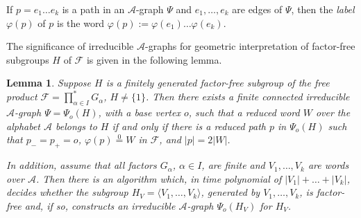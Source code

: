 \documentclass[10pt, reqno]{amsart}
\numberwithin{equation}{section}
\newtheorem{lem}[thm]{Lemma}
\begin{document}
If $p = e_1 \dots e_k$ is a path in an  ${\mathcal{A}}$-graph $\Psi$ and $e_1, \dots, e_k$ are edges of $\Psi$, then the {\em label} ${\varphi}(p)$ of $p$ is the word ${\varphi}(p) := {\varphi}(e_1) \dots {\varphi}(e_k)$.

The significance of irreducible ${\mathcal{A}}$-graphs for geometric interpretation of  factor-free subgroups $H$ of ${\mathcal{F}}$ is given in the following lemma.

\begin{lem}\label{Lm1} Suppose $H$ is a finitely generated factor-free subgroup
of the free product ${\mathcal{F}} =  \prod_{\alpha \in I}^* G_\alpha$, $H \ne \{ 1 \}$. Then there exists a finite connected
irreducible ${\mathcal{A}}$-graph $\Psi = \Psi_o(H)$, with a  base vertex $o$,  such that a reduced word $W$ over the alphabet ${\mathcal{A}}$ belongs to $H$ if and only if there is a reduced path $p$ in $\Psi_o(H)$  such that $p_- =p_+
=o$,  ${\varphi}(p) \overset 0  = W$ in   ${\mathcal{F}}$, and $| p | = 2|W|$.

In addition, assume that all factors $G_\alpha$, $\alpha \in I$, are finite and  $V_1, \dots, V_k$  are  words over ${\mathcal{A}}$. Then there is an algorithm which, in time  polynomial of $|V_1|+ \dots+ |V_k|$, decides whether the subgroup  $H_V = \langle V_1, \dots, V_k \rangle$, generated by $V_1, \dots, V_k$, is factor-free and, if so, constructs an irreducible ${\mathcal{A}}$-graph $\Psi_o(H_V)$ for $H_V$.
\end{lem}
\end{document}
